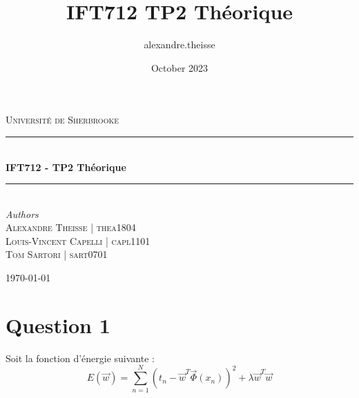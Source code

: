 \documentclass{article}
\title{IFT712 TP2 Théorique}
\author{alexandre.theisse }
\date{October 2023}
\begin{document}
\begin{titlepage} %
	\newcommand{\HRule}{\rule{\linewidth}{0.5mm}} %
	
	\center %
	
	
	\textsc{\LARGE Université de Sherbrooke}\\[1.5cm] %
	
	
	\HRule\\[0.4cm]
	
	{\huge\bfseries IFT712 - TP2 Théorique}\\[0.4cm]
	
	\HRule\\[1.5cm]
	

	{\large\textit{Authors}}\\
            \textsc{Alexandre Theisse | thea1804}\\
            \textsc{Louis-Vincent Capelli | capl1101}\\
            \textsc{Tom Sartori | sart0701}\\
	
	
	\vfill\vfill\vfill %
	
	{\large\today} %
	
	\vfill %
	
\end{titlepage}

\section{Question 1}
Soit la fonction d'énergie suivante : \[ E( \overrightarrow{w} )= \sum_{n=1}^{N}(t_{n} - \overrightarrow{w}^T \overrightarrow{\Phi}(x_{n}))^2 + \lambda\overrightarrow{w}^T \overrightarrow{w} \]
\end{document}
